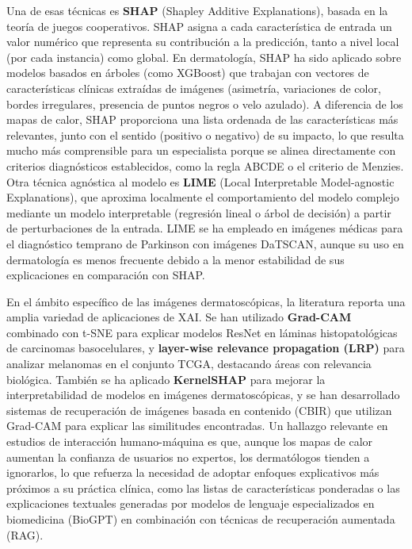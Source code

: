 Una de esas técnicas es \textbf{SHAP} (Shapley Additive Explanations), basada en la teoría 
de juegos cooperativos. SHAP asigna a cada característica de entrada un valor numérico que 
representa su contribución a la predicción, tanto a nivel local (por cada instancia) como 
global. En dermatología, SHAP ha sido aplicado sobre modelos basados en árboles (como 
XGBoost) que trabajan con vectores de características clínicas extraídas de imágenes 
(asimetría, variaciones de color, bordes irregulares, presencia de puntos negros o velo 
azulado). A diferencia de los mapas de calor, SHAP proporciona una lista ordenada de las 
características más relevantes, junto con el sentido (positivo o negativo) de su impacto, 
lo que resulta mucho más comprensible para un especialista porque se alinea directamente 
con criterios diagnósticos establecidos, como la regla ABCDE o el criterio de Menzies. 
Otra técnica agnóstica al modelo es \textbf{LIME} (Local Interpretable Model-agnostic 
Explanations), que aproxima localmente el comportamiento del modelo complejo mediante 
un modelo interpretable (regresión lineal o árbol de decisión) a partir de perturbaciones 
de la entrada. LIME se ha empleado en imágenes médicas para el diagnóstico temprano de 
Parkinson con imágenes DaTSCAN, aunque su uso en dermatología es menos frecuente debido a 
la menor estabilidad de sus explicaciones en comparación con SHAP.

En el ámbito específico de las imágenes dermatoscópicas, la literatura reporta una amplia 
variedad de aplicaciones de XAI. Se han utilizado \textbf{Grad-CAM} combinado con t-SNE 
para explicar modelos ResNet en láminas histopatológicas de carcinomas basocelulares, y 
\textbf{layer-wise relevance propagation (LRP)} para analizar melanomas en el conjunto 
TCGA, destacando áreas con relevancia biológica. También se ha aplicado \textbf{KernelSHAP}
para mejorar la interpretabilidad de modelos en imágenes dermatoscópicas, y se han 
desarrollado sistemas de recuperación de imágenes basada en contenido (CBIR) que utilizan 
Grad-CAM para explicar las similitudes encontradas. Un hallazgo relevante en estudios de 
interacción humano-máquina es que, aunque los mapas de calor aumentan la confianza de 
usuarios no expertos, los dermatólogos tienden a ignorarlos, lo que refuerza la necesidad
de adoptar enfoques explicativos más próximos a su práctica clínica, como las listas de 
características ponderadas o las explicaciones textuales generadas por modelos de lenguaje 
especializados en biomedicina (BioGPT) en combinación con técnicas de recuperación 
aumentada (RAG).

